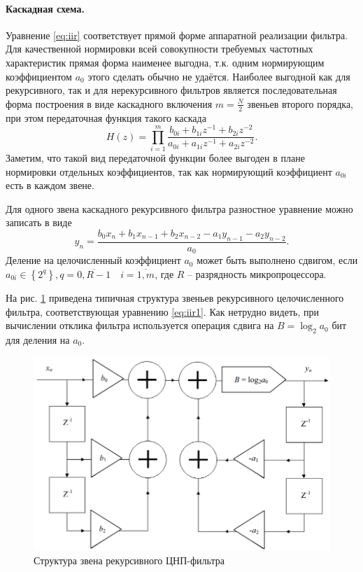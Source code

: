 \documentclass[a4paper,14pt]{extarticle}
\begin{document}
\paragraph{Каскадная схема.} Уравнение \eqref{eq:iir} соответствует прямой форме аппаратной реализации фильтра. Для качественной нормировки всей совокупности требуемых частотных характеристик прямая форма наименее выгодна, т.к. одним нормирующим коэффициентом $a_0$ этого сделать обычно не удаётся. Наиболее выгодной как для рекурсивного, так и для нерекурсивного фильтров является последовательная форма построения в виде каскадного включения $m=\frac{N}{2}$ звеньев второго порядка, при этом передаточная функция такого каскада
\begin{equation}
  H(z)=\prod_{i=1}^{m} \frac{b_{0 i}+b_{1 i} z^{-1}+b_{2 i} z^{-2}}{a_{0 i}+a_{1 i} z^{-1}+a_{2 i} z^{-2}}.
  \label{eq:iir_cascad}
\end{equation}
Заметим, что такой вид передаточной функции более выгоден в плане нормировки отдельных коэффициентов, так как нормирующий коэффициент $a_{0i}$ есть в каждом звене. 

Для одного звена каскадного рекурсивного фильтра разностное уравнение можно записать в виде
\begin{equation}
  y_{n}=\frac{b_{0} x_{n}+b_{1} x_{n-1}+b_{2} x_{n-2}-a_{1} y_{n-1}-a_{2} y_{n-2}}{a_{0}}.
  \label{eq:iir1}
\end{equation}
Деление на целочисленный коэффициент $a_0$ может быть выполнено сдвигом, если $a_{0 i} \in\left\{2^{q}\right\}, q=\overline{0, R-1} \quad i=\overline{1, m}$, где $R$ -- разрядность микропроцессора.

На рис. \ref{fig:figure1} приведена типичная структура звеньев рекурсивного целочисленного фильтра, соответствующая уравнению \eqref{eq:iir1}. Как нетрудно видеть, при вычислении отклика фильтра используется операция сдвига на $B=\log_2a_0$ бит для деления на $a_0$.

\begin{figure}[H]
  \centering
  \includegraphics[width=\textwidth]{img/img1}
  \caption{Структура звена рекурсивного ЦНП-фильтра}
  \label{fig:figure1}
\end{figure}
\end{document}
